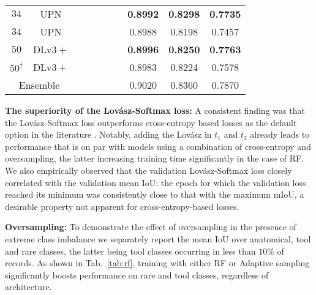 \documentclass[runningheads]{llncs}
\newcommand{\mc}[1]{\multicolumn{1}{c}{#1}}
\newcommand{\dvp}{DLv$3+$}
\newcommand{\upr}{UPN}
\newcommand{\lov}{Lov\'{a}sz}
\newcommand{\tbf}[1]{\textbf{#1}}
\newcommand{\tick}{\checkmark}
\newcommand{\ta}[1]{\textbf{$t_{#1}$}}
\begin{document}
\begin{table}[ht]
\begin{tabular}{c c c c c c c c c c}
    \mc{$34$} & \upr                 & \mc{}        & \mc{}       & \mc{\tick} & \mc{\tick}  & \mc{}      & \mc{\tbf{0.8992}} & \mc{\tbf{0.8298}} & \mc{\tbf{0.7735}} \\
    \mc{$34$} & \upr                 & \mc{}        & \mc{}       & \mc{\tick} & \mc{}       & \mc{\tick} & \mc{0.8988} & \mc{0.8198} & \mc{0.7457} \\
    \midrule
    \mc{$50$} & \dvp                 & \mc{}        & \mc{}       & \mc{\tick} & \mc{\tick}  & \mc{}      & \mc{\tbf{0.8996}} & \mc{\tbf{0.8250}} & \mc{\tbf{0.7763}} \\
    \mc{$50^{ \dagger}$} & \dvp      & \mc{}        & \mc{}       & \mc{\tick} & \mc{\tick}  & \mc{}      & \mc{0.8983} & \mc{0.8224} & \mc{0.7578} \\
    \midrule
    \multicolumn{2}{c}{Ensemble}     & \mc{}        & \mc{}       & \mc{\tick} & \mc{\tick}  & \mc{}      & \mc{0.9020} & \mc{0.8360} & \mc{0.7870} \\

    \bottomrule
  \end{tabular}
\end{table}

\noindent\tbf{The superiority of the \lov{}-Softmax loss:}
A consistent finding was that the \lov{}-Softmax loss outperforms cross-entropy based losses as the default option in the literature \cite{Deeplabv3plus,OCR,UPerNet}. Notably, adding the \lov{} in \ta1 and \ta2 already leads to performance that is on par with models using a combination of cross-entropy and oversampling, the latter increasing training time significantly in the case of RF. We also empirically observed that the validation \lov{}-Softmax loss closely correlated with the validation mean IoU: the epoch for which the validation loss reached its minimum was consistently close to that with the maximum mIoU, a desirable property not apparent for cross-entropy-based losses.

\noindent\tbf{Oversampling:}
To demonstrate the effect of oversampling in the presence of extreme class imbalance we separately report the mean IoU over anatomical, tool and rare classes, the latter being tool classes occurring in less than $10\%$ of records. As shown in Tab.~\ref{tab:rf}, training with either RF or Adaptive sampling significantly boosts performance on rare and tool classes, regardless of architecture.
\end{document}
